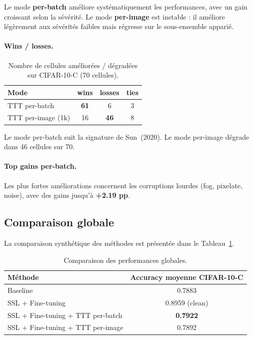 \documentclass[12pt,a4paper]{report}
\begin{document}
	Le mode \textbf{per-batch} améliore systématiquement les performances, avec un gain croissant selon la sévérité.  
	Le mode \textbf{per-image} est instable : il améliore légèrement aux sévérités faibles mais régresse sur le sous-ensemble apparié.
	
	\paragraph{Wins / losses.}
	
	\begin{table}[H]
		\centering
		\begin{tabular}{lccc}
			\toprule
			Mode & wins & losses & ties \\
			\midrule
			TTT per-batch & \textbf{61} & 6 & 3 \\
			TTT per-image (1k) & 16 & \textbf{46} & 8 \\
			\bottomrule
		\end{tabular}
		\caption{Nombre de cellules améliorées / dégradées sur CIFAR-10-C (70 cellules).}
	\end{table}
	
	Le mode per-batch suit la signature de Sun~(2020).  
	Le mode per-image dégrade dans 46 cellules sur 70.
	
	\paragraph{Top gains per-batch.}
	
	Les plus fortes améliorations concernent les corruptions lourdes (fog, pixelate, noise), avec des gains jusqu’à \textbf{+2.19 pp}.
	
	\subsection{Comparaison globale}
	
	La comparaison synthétique des méthodes est présentée dans le Tableau~\ref{tab:global_comparison}.
	
	\begin{table}[H]
		\centering
		\begin{tabular}{lc}
			\toprule
			\textbf{Méthode} & \textbf{Accuracy moyenne CIFAR-10-C} \\
			\midrule
			Baseline & 0.7883 \\
			SSL + Fine-tuning & 0.8959 (clean) \\
			SSL + Fine-tuning + TTT per-batch & \textbf{0.7922} \\
			SSL + Fine-tuning + TTT per-image & 0.7892 \\
			\bottomrule
		\end{tabular}
		\caption{Comparaison des performances globales.}
		\label{tab:global_comparison}
	\end{table}
	
\end{document}
